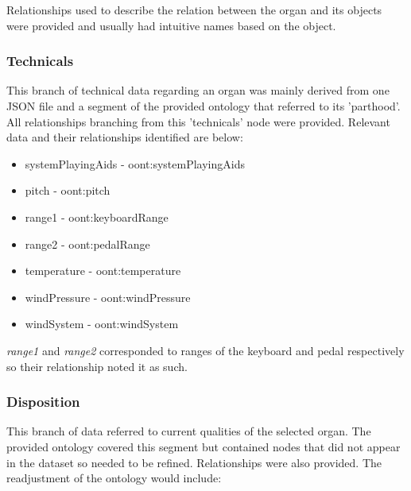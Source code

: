 Relationships used to describe the relation between the organ and its objects were provided and usually had intuitive names based on the object. 

\subsubsection{Technicals}
\hspace*{0.5cm} This branch of technical data regarding an organ was mainly derived from one JSON file and a segment of the provided ontology that referred to its 'parthood'. All relationships branching from this 'technicals' node were provided. Relevant data and their relationships identified are below:

\vspace{-0.1cm}
\begin{itemize}
    \itemsep0em 
    \item systemPlayingAids - oont:systemPlayingAids
    \vspace{-0.05cm}
    \item pitch - oont:pitch
    \vspace{-0.05cm}
    \item range1 -  oont:keyboardRange
    \vspace{-0.05cm}
    \item range2 - oont:pedalRange
    \vspace{-0.05cm}
    \item temperature - oont:temperature
    \vspace{-0.05cm}
    \item windPressure - oont:windPressure
    \vspace{-0.05cm}
    \item windSystem - oont:windSystem
\end{itemize}

\textit{range1} and \textit{range2} corresponded to ranges of the keyboard and pedal respectively so their relationship noted it as such. 

\subsubsection{Disposition}
\hspace*{0.5cm} This branch of data referred to current qualities of the selected organ. The provided ontology covered this segment but contained nodes that did not appear in the dataset so needed to be refined. Relationships were also provided. The readjustment of the ontology would include:

